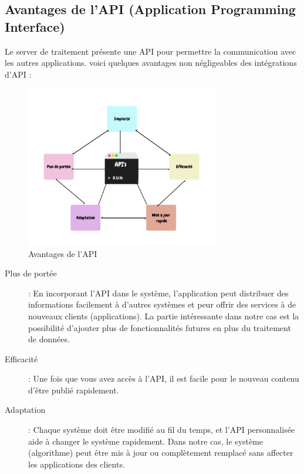 \subsection{Avantages de l'API (Application Programming Interface)}
Le server de traitement présente une API pour permettre la communication avec les autres applications. voici quelques avantages non négligeables des intégrations d'API \cite{BenefitsAPIDevelopers2019}:

\begin{figure}[h!]
    \center
    \includegraphics[width=0.75\textwidth]{Images/chapter3/apiAvantages.png}
    \caption{Avantages de l'API}
  \end{figure}


\begin{description}
    
    \item [Plus de portée]:  En incorporant l’API dans le système, l’application peut distribuer des informations facilement à
    d’autres systèmes et peur offrir des services à de nouveaux clients (applications). La partie intéressante dans notre cas est la possibilité d'ajouter plus de fonctionnalités futures en plus du traitement de données.
     \item[Efficacité] : Une fois que vous avez accès à l'API, il est facile pour le nouveau contenu d'être publié rapidement.
     \item[Adaptation] : Chaque système doit être modifié au fil du temps, et l'API personnalisée aide à changer le système rapidement. Dans notre cas, le système (algorithme) peut être mis à jour ou complètement remplacé sans affecter les applications des clients.
     
\end{description} 



